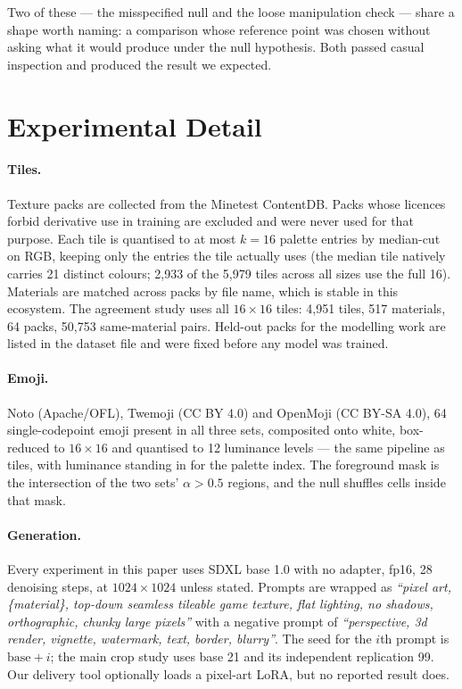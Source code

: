 \documentclass{article}
\begin{document}
Two of these --- the misspecified null and the loose manipulation check ---
share a shape worth naming: a comparison whose reference point was chosen
without asking what it would produce under the null hypothesis. Both passed
casual inspection and produced the result we expected.


\section{Experimental Detail}
\label{app:detail}

\paragraph{Tiles.} Texture packs are collected from the Minetest ContentDB.
Packs whose licences forbid derivative use in training are excluded and were
never used for that purpose. Each tile is quantised to at most $k{=}16$
palette entries by median-cut on RGB, keeping only the entries the tile
actually uses (the median tile natively carries 21 distinct colours;
2{,}933 of the 5{,}979 tiles across all sizes use the full 16). Materials are matched across packs by file name, which is stable in
this ecosystem. The agreement study uses all $16\times16$ tiles: 4{,}951
tiles, 517 materials, 64 packs, 50{,}753 same-material pairs. Held-out packs
for the modelling work are listed in the dataset file and were fixed before
any model was trained.

\paragraph{Emoji.} Noto (Apache/OFL), Twemoji (CC BY 4.0) and OpenMoji
(CC BY-SA 4.0), 64 single-codepoint emoji present in all three sets,
composited onto white, box-reduced to $16\times16$ and quantised to 12
luminance levels --- the same pipeline as tiles, with luminance standing in
for the palette index. The foreground mask is the intersection of the two
sets' $\alpha > 0.5$ regions, and the null shuffles cells inside that mask.

\paragraph{Generation.} Every experiment in this paper uses SDXL base 1.0
with no adapter, fp16, 28 denoising steps, at $1024\times1024$ unless stated.
Prompts are wrapped as \emph{``pixel art, \{material\}, top-down seamless
tileable game texture, flat lighting, no shadows, orthographic, chunky large
pixels''} with a negative prompt of \emph{``perspective, 3d render, vignette,
watermark, text, border, blurry''}. The seed for the $i$th prompt is
$\text{base}+i$; the main crop study uses base 21 and its independent
replication 99. Our delivery tool optionally loads a pixel-art LoRA, but no
reported result does.
\end{document}
